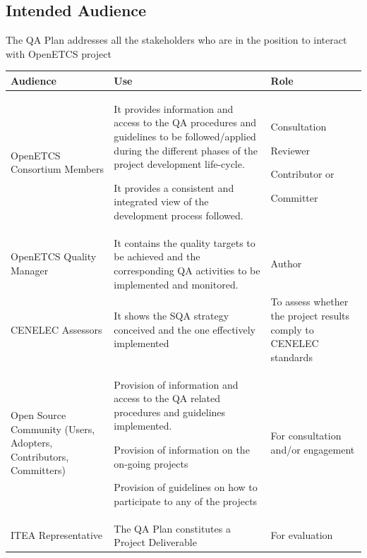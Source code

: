 \documentclass{template/openetcs_article}
\begin{document}
\subsection{Intended Audience}

The QA Plan addresses all the stakeholders who are in the position to interact with OpenETCS project

\begin{flushleft}
\tablefirsthead{}
\tablehead{}
\tabletail{}
\tablelasttail{}
\begin{supertabular}[H]{|m{3cm}|m{9cm}|m{3cm}|}
\hline
{}
Audience &
Use &
Role\\\hline
OpenETCS Consortium Members &
\begin{description}
\item It provides information and access to the QA procedures and guidelines to be followed/applied during the different phases of the project development life-cycle.
\item It provides a consistent and integrated view of the development process followed.
\end{description} &
\begin{description}
\item Consultation
\item Reviewer
\item Contributor or 
\item Committer
\end{description}\\\hline
OpenETCS Quality Manager &
It contains the quality targets to be achieved and the corresponding QA activities to be implemented and monitored. &
Author\\\hline
CENELEC Assessors &
It shows the SQA strategy conceived and the one effectively implemented &
To assess whether the project results comply to CENELEC standards\\\hline
Open Source Community (Users, Adopters, Contributors, Committers) &
\begin{description}
\item Provision of information and access to the QA related procedures and guidelines implemented.
\item Provision of information on the on-going projects
\item Provision of guidelines on how to participate to any of the projects
\end{description}
&
For consultation and/or engagement\\\hline
ITEA Representative &
The QA Plan constitutes a Project Deliverable &
For evaluation \\\hline
\end{supertabular}
\end{flushleft}
\end{document}
